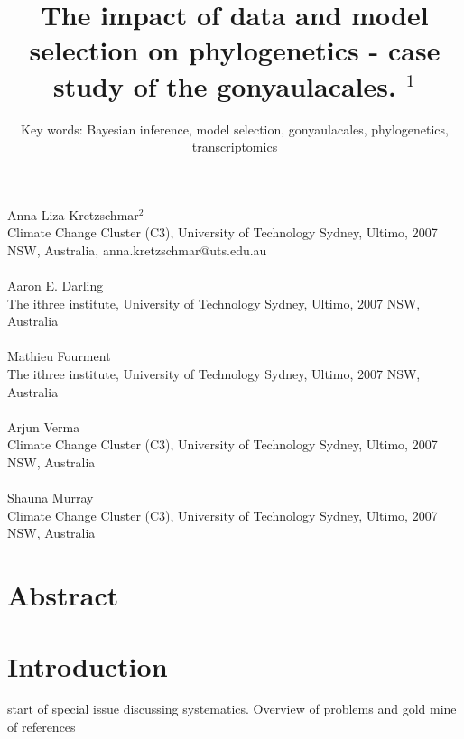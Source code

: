 \documentclass[12pt]{article}
\title{The impact of data and model selection on phylogenetics - case study of the gonyaulacales. $^{1}$}
\author{Key words: Bayesian inference, model selection, gonyaulacales, phylogenetics, transcriptomics}
\date{}
\begin{document}
\maketitle
\paragraph{}Anna Liza Kretzschmar$^{2}$\\
Climate Change Cluster (C3), University of Technology Sydney, Ultimo, 2007 NSW, Australia, anna.kretzschmar@uts.edu.au
\paragraph{}Aaron E. Darling \\
The ithree institute, University of Technology Sydney, Ultimo, 2007 NSW, Australia
\paragraph{}Mathieu Fourment \\
The ithree institute, University of Technology Sydney, Ultimo, 2007 NSW, Australia
\paragraph{}Arjun Verma\\
Climate Change Cluster (C3), University of Technology Sydney, Ultimo, 2007 NSW, Australia
\paragraph{}Shauna Murray\\ 
Climate Change Cluster (C3), University of Technology Sydney, Ultimo, 2007 NSW, Australia
\newpage
\section{Abstract}
\newpage

\section{Introduction}

\cite{posada2016phylogenomics} start of special issue discussing systematics. Overview of problems and gold mine of references
\end{document}
